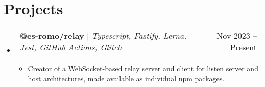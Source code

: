 \documentclass[letterpaper,11pt]{article}
\makeatletter
\newcommand{\resumeItem}[1]{
  \item\small{#1}
}
\newcommand{\resumeSubheading}[4]{
  \vspace{-2pt}\item
    \begin{tabular*}{0.97\textwidth}[t]{l@{\extracolsep{\fill}}r}
      \textbf{#1} & #2 \\
      \textit{\small#3} & \textit{\small #4} \\
    \end{tabular*}\vspace{-7pt}
}
\newcommand{\resumeSimpleSubheading}[2]{
  \vspace{-2pt}\item
    \begin{tabular*}{0.97\textwidth}[t]{l@{\extracolsep{\fill}}r}
      \small\textbf{#1} & #2 \\
    \end{tabular*}\vspace{-7pt}
}
\newcommand{\resumeProjectHeading}[2]{
    \item
    \begin{tabular*}{0.97\textwidth}{l@{\extracolsep{\fill}}r}
      \small#1 & #2 \\
    \end{tabular*}\vspace{-7pt}
}
\newcommand{\resumeSubHeadingListStart}{\begin{itemize}[leftmargin=0.15in, label={}]}
\newcommand{\resumeSubHeadingListEnd}{\end{itemize}}
\newcommand{\resumeItemListStart}{\begin{itemize}}
\newcommand{\resumeItemListEnd}{\end{itemize}}
\makeatother
\begin{document}
\section{Projects}
    \resumeSubHeadingListStart
      \resumeProjectHeading
          {\textbf{@es-romo/relay} $|$ \emph{Typescript, Fastify, Lerna, Jest, GitHub Actions, Glitch }}{Nov 2023 -- Present}
          \resumeItemListStart
            \resumeItem{Creator of a WebSocket-based relay server and client for listen server and host architectures, made available as individual npm packages.}
          \resumeItemListEnd
    \resumeSubHeadingListEnd


\end{document}

